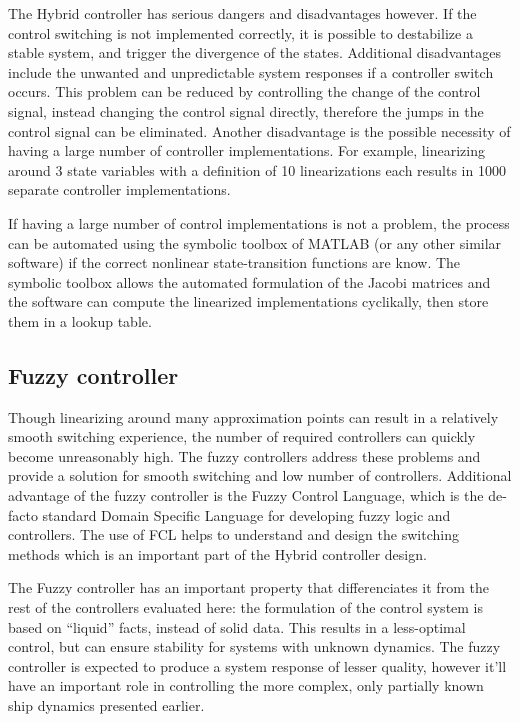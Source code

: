 The Hybrid controller has serious dangers and disadvantages however. If the control switching is not implemented correctly, it is possible to destabilize a stable system, and trigger the divergence of the states.
Additional disadvantages include the unwanted and unpredictable system responses if a controller switch occurs. This problem can be reduced by controlling the change of the control signal, instead changing the control signal directly, therefore the jumps in the control signal can be eliminated.
Another disadvantage is the possible necessity of having a large number of controller implementations. For example, linearizing around 3 state variables with a definition of 10 linearizations each results in 1000 separate controller implementations.

If having a large number of control implementations is not a problem, the process can be automated using the symbolic toolbox of MATLAB (or any other similar software) if the correct nonlinear state-transition functions are know.
The symbolic toolbox allows the automated formulation of the Jacobi matrices and the software can compute the linearized implementations cyclikally, then store them in a lookup table. 

\subsection{Fuzzy controller}
Though linearizing around many approximation points can result in a relatively smooth switching experience, the number of required controllers can quickly become unreasonably high. The fuzzy controllers address these problems and provide a solution for smooth switching and low number of controllers. Additional advantage of the fuzzy controller is the Fuzzy Control Language, which is the de-facto standard Domain Specific Language for developing fuzzy logic and controllers. The use of FCL helps to understand and design the switching methods which is an important part of the Hybrid controller design.

The Fuzzy controller has an important property that differenciates it from the rest of the controllers evaluated here: the formulation of the control system is based on “liquid” facts, instead of solid data. This results in a less-optimal control, but can ensure stability for systems with unknown dynamics. The fuzzy controller is expected to produce a system response of lesser quality, however it’ll have an important role in controlling the more complex, only partially known ship dynamics presented earlier.

